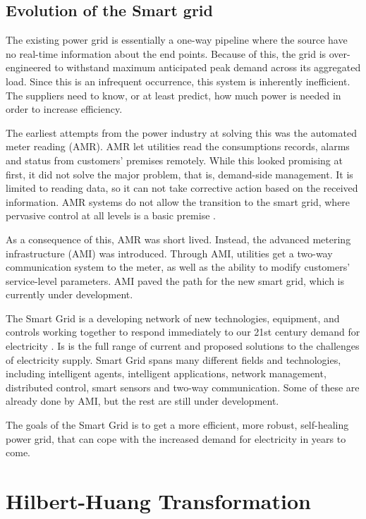 \documentclass[12pt]{article}
\begin{document}
	\subsection{Evolution of the Smart grid}
		\label{sec:smartGrid}
		The existing power grid is essentially a one-way pipeline where the source have no real-time information about the end points. Because of this, the grid is over-engineered to withstand maximum anticipated peak demand across its aggregated load. Since this is an infrequent occurrence, this system is inherently inefficient. The suppliers need to know, or at least predict, how much power is needed in order to increase efficiency. 
		
		The earliest attempts from the power industry at solving this was the automated meter reading (AMR). AMR let utilities read the consumptions records, alarms and status from customers' premises remotely. While this looked promising at first, it did not solve the major problem, that is, demand-side management. It is limited to reading data, so it can not take corrective action based on the received information. AMR systems do not allow the transition to the smart grid, where pervasive control at all levels is a basic premise \cite{smartgridPath}.
		
		As a consequence of this, AMR was short lived. Instead, the advanced metering infrastructure (AMI) was introduced. Through AMI, utilities get a two-way communication system to the meter, as well as the ability to modify customers' service-level parameters. AMI paved the path for the new smart grid, which is currently under development.
		
		The Smart Grid is a developing network of new technologies, equipment, and controls working together to respond immediately to our 21st century demand for electricity \cite{smartGridGov}. Is is the full range of current and proposed solutions to the challenges of electricity supply. Smart Grid spans many different fields and technologies, including intelligent agents, intelligent applications, network management, distributed control, smart sensors and two-way communication. Some of these are already done by AMI, but the rest are still under development. 
		
		The goals of the Smart Grid is to get a more efficient, more robust, self-healing power grid, that can cope with the increased demand for electricity in years to come.


\newpage
\section{Hilbert-Huang Transformation}
	\label{sec:hilbertHuangTransformation}
	
\end{document}
